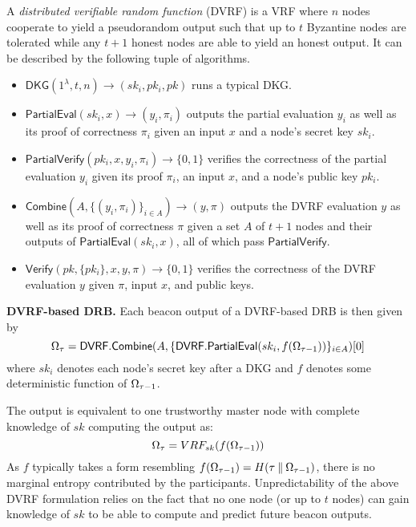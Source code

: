 \begin{definition}
A \textit{distributed verifiable random function} (DVRF) is a VRF where $n$ nodes cooperate to yield a pseudorandom output such that up to $t$ Byzantine nodes are tolerated while any $t + 1$ honest nodes are able to yield an honest output. It can be described by the following tuple of algorithms.
\begin{itemize}
\item $\mathsf{DKG}(1^\lambda, t, n) \rightarrow (sk_i, pk_i, pk)$ runs a typical DKG.
\item $\mathsf{PartialEval}(sk_i, x) \rightarrow (y_i, \pi_i)$ outputs the partial evaluation $y_i$ as well as its proof of correctness $\pi_i$ given an input $x$ and a node's secret key $sk_i$.
\item $\mathsf{PartialVerify}(pk_i, x, y_i, \pi_i) \rightarrow \{0, 1\}$ verifies the correctness of the partial evaluation $y_i$ given its proof $\pi_i$, an input $x$, and a node's public key $pk_i$.
\item $\mathsf{Combine}(A, \{(y_i, \pi_i)\}_{i \in A}) \rightarrow (y, \pi)$ outputs the DVRF evaluation $y$ as well as its proof of correctness $\pi$ given a set $A$ of $t + 1$ nodes and their outputs of $\mathsf{PartialEval}(sk_i, x)$, all of which pass $\mathsf{PartialVerify}$.
\item $\mathsf{Verify}(pk, \{pk_i\}, x, y, \pi) \rightarrow \{0, 1\}$ verifies the correctness of the DVRF evaluation $y$ given $\pi$, input $x$, and public keys.
\end{itemize}
\end{definition}

\noindent\textbf{DVRF-based DRB.} Each beacon output of a DVRF-based DRB is then given by
\begingroup\makeatletter\def\f@size{8}\check@mathfonts
\[
\Omega_\tau = \mathsf{DVRF.Combine}(A, \{\mathsf{DVRF.PartialEval}(sk_i, f(\Omega_{\tau - 1}))\}_{i \in A})[0]
\]\endgroup
where $sk_i$ denotes each node's secret key after a DKG and $f$ denotes some deterministic function of $\Omega_{\tau - 1}$.

The output is equivalent to one trustworthy master node with complete knowledge of $sk$ computing the output as:
\[
\Omega_\tau = VRF_{sk}(f(\Omega_{\tau - 1}))
\]
As $f$ typically takes a form resembling $f(\Omega_{\tau - 1}) = H(\tau \mathbin\Vert \Omega_{\tau - 1})$, there is no marginal entropy contributed by the participants. Unpredictability of the above DVRF formulation relies on the fact that no one node (or up to $t$ nodes) can gain knowledge of $sk$ to be able to compute and predict future beacon outputs.\\

